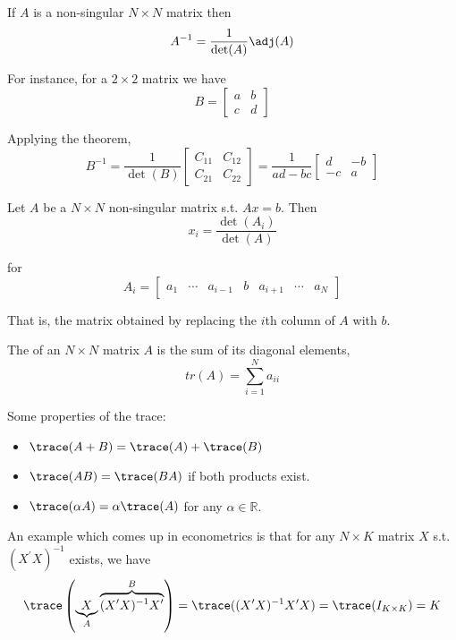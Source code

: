 \documentclass{article}
\begin{document}
\begin{theorem}
  If $A$ is a non-singular $N \times N$ matrix then
  \[
    A^{-1} = \dfrac{1}{\det(A)} \adj(A)
  \]
\end{theorem}

For instance, for a $2 \times 2$ matrix we have
\[
  B = \left[\begin{matrix}
      a & b \\ c & d
  \end{matrix}\right]
\]

Applying the theorem,
\[
  B^{-1}
  =
  \dfrac{1}{\det(B)}
  \left[\begin{matrix}
      C_{11} & C_{12} \\
      C_{21} & C_{22}
  \end{matrix}\right]
  =
  \dfrac{1}{ad - bc}
  \left[\begin{matrix}
      d & -b \\ -c & a
  \end{matrix}\right]
\]

\begin{theorem}
  Let $A$ be a $N \times N$ non-singular matrix s.t. $A x = b$. Then
  \[
    x_i = \dfrac{\det(A_i)}{\det(A)}
  \]

  for
  \[
    A_i = \left[\begin{matrix}
        a_1 & \cdots & a_{i - 1} & b & a_{i + 1} & \cdots & a_N
    \end{matrix}\right]
  \]

  That is, the matrix obtained by replacing the $i$th column of $A$ with $b$.
\end{theorem}

\begin{definition}
  The  of an $N \times N$ matrix $A$ is the sum of its diagonal elements,
  \[
    tr(A) = \sum^{N}_{i = 1} a_{ii}
  \]
\end{definition}

Some properties of the trace:
\begin{itemize}[label=$\bullet$]
  \item $\trace(A + B) = \trace(A) + \trace(B)$
  \item $\trace(A B) = \trace(BA)$ if both products exist.
  \item $\trace(\alpha A) = \alpha \trace(A)$ for  any $\alpha \in \mathbb{R}$.
\end{itemize}

An example which comes up in econometrics is that for any $N \times K$ matrix $X$ s.t. $\left(X^\prime X\right)^{-1}$ exists, we have
\[
  \trace\left(\underbrace{X}_{A} \overbrace{(X^\prime X)^{-1} X^\prime}^{B}\right)
  =
  \trace((X^\prime X)^{-1} X^\prime X)
  =
  \trace(I_{K \times K})
  =
  K
\]
\end{document}

